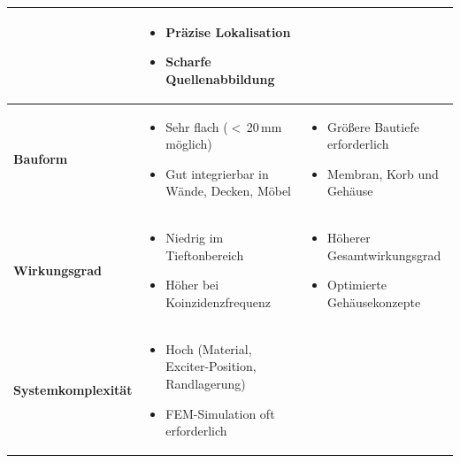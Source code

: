 \begin{table}[htbp]
\begin{tabularx}{\textwidth}{|X|X|X|}
&
\vspace{-2mm}
\begin{itemize}[leftmargin=*, nosep, topsep=0pt, parsep=0pt]
    \item Präzise Lokalisation
    \item Scharfe Quellenabbildung
\end{itemize}
\vspace{-2mm} \\
\hline
\textbf{Bauform} &
\vspace{-2mm}
\begin{itemize}[leftmargin=*, nosep, topsep=0pt, parsep=0pt]
    \item Sehr flach ($<$\,20\,mm möglich)
    \item Gut integrierbar in Wände, Decken, Möbel
\end{itemize}
\vspace{-2mm}
&
\vspace{-2mm}
\begin{itemize}[leftmargin=*, nosep, topsep=0pt, parsep=0pt]
    \item Größere Bautiefe erforderlich
    \item Membran, Korb und Gehäuse
\end{itemize}
\vspace{-2mm} \\
\hline
\textbf{Wirkungsgrad} &
\vspace{-2mm}
\begin{itemize}[leftmargin=*, nosep, topsep=0pt, parsep=0pt]
    \item Niedrig im Tieftonbereich
    \item Höher bei Koinzidenzfrequenz
\end{itemize}
\vspace{-2mm}
&
\vspace{-2mm}
\begin{itemize}[leftmargin=*, nosep, topsep=0pt, parsep=0pt]
    \item Höherer Gesamtwirkungsgrad
    \item Optimierte Gehäusekonzepte
\end{itemize}
\vspace{-2mm} \\
\hline
\textbf{System\-komplexität} &
\vspace{-2mm}
\begin{itemize}[leftmargin=*, nosep, topsep=0pt, parsep=0pt]
    \item Hoch (Material, Exciter-Position, Randlagerung)
    \item FEM-Simulation oft erforderlich

\end{itemize}
\end{tabularx}
\end{table}
